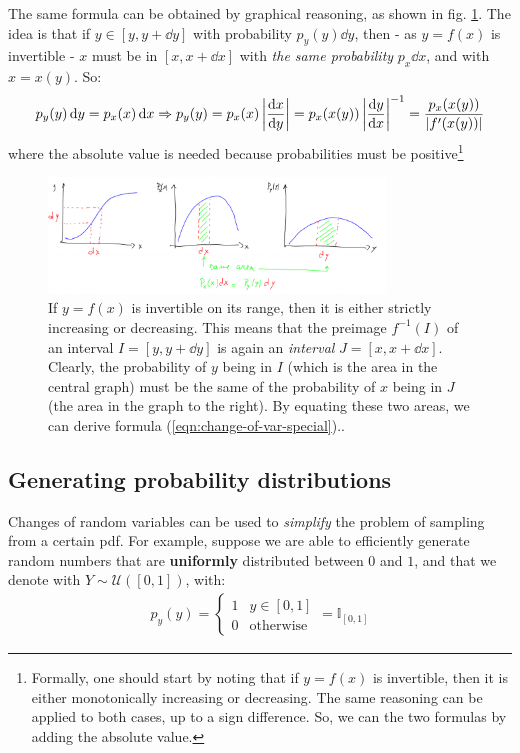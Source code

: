 \documentclass[../template.tex]{subfiles}
\begin{document}
The same formula can be obtained by graphical reasoning, as shown in fig. \ref{fig:graphical-change}. The idea is that if $y \in [y,y+\dd{y}]$ with probability $p_y(y)\dd{y}$, then - as $y=f(x)$ is invertible - $x$ must be in $[x, x+\dd{x}]$ with \textit{the same probability} $p_x \dd{x}$, and with $x = x(y)$. So:
\begin{align*}
    p_y(y) \dd{y} = p_x(x) \dd{x} \Rightarrow p_y(y) = p_x(x) \left|\dv{x}{y}\right| = p_x(x(y)) \left|\dv{y}{x}\right|^{-1} = \frac{p_x(x(y))}{|f'(x(y))|} 
\end{align*}
where the absolute value is needed because probabilities must be positive\footnote{Formally, one should start by noting that if $y=f(x)$ is invertible, then it is either monotonically increasing or decreasing. The same reasoning can be applied to both cases, up to a sign difference. So, we can  the two formulas by adding the absolute value.}

\begin{figure}[htp]
    \centering
    \includegraphics[width=0.8\textwidth]{image001.png}
    \caption{If $y=f(x)$ is invertible on its range, then it is either strictly increasing or decreasing. This means that the preimage $f^{-1}(I)$ of an interval $I = [y, y+\dd{y}]$ is again an \textit{interval} $J=[x, x+\dd{x}]$. Clearly, the probability of $y$ being in $I$ (which is the area in the central graph) must be the same of the probability of $x$ being in $J$ (the area in the graph to the right). By equating these two areas, we can derive formula (\ref{eqn:change-of-var-special}).\label{fig:graphical-change}.}
\end{figure}

\subsection{Generating probability distributions}
Changes of random variables can be used to \textit{simplify} the problem of sampling from a certain pdf. For example, suppose we are able to efficiently generate random numbers that are \textbf{uniformly} distributed between $0$ and $1$, and that we denote with $Y \sim \mathcal{U}([0,1])$, with:
\begin{align} \label{eqn:unif}
    p_y(y) = \begin{cases}
        1 & y \in [0,1]\\
        0 & \text{otherwise}
    \end{cases} = \mathbb{I}_{[0,1]}
\end{align}
\end{document}
